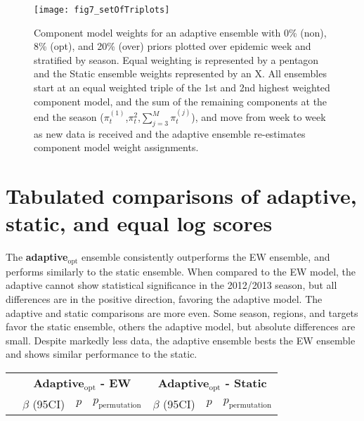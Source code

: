 \documentclass[sagev,times,Review,10pt]{sagej}
\def\adaptOpt{\textbf{adaptive$_{\text{opt}}$ }}
\begin{document}
\begin{appendix}
\graphicspath{{../../../_6_TLGs/_G/fig7_setOfTriPlots/}}
\begin{figure}[ht!]
    \centering
    \texttt{[image: fig7\_setOfTriplots]}
    \caption{Component model weights for an adaptive ensemble with 0\% (non), 8\% (opt), and 20\% (over) priors plotted over epidemic week and stratified by season.
    Equal weighting is represented by a pentagon and the Static ensemble weights represented by an X.
    All ensembles start at an equal weighted triple of the 1st and 2nd highest weighted component model, and the sum of the remaining components at the end the season ($\pi_{t}^{(1)}$,$\pi_{t}^{2}$,$\sum_{j=3}^{M}\pi_{t}^{(j)}$), and move from week to week as new data is received and the adaptive ensemble re-estimates component model weight assignments.
        \label{fig.bagOfDoritos}}
\end{figure}


\clearpage
\section{Tabulated comparisons of adaptive, static, and equal log scores}
\label{tbRegress}

The \adaptOpt ensemble consistently outperforms the EW ensemble, and performs similarly to the static ensemble.
When compared to the EW model, the adaptive cannot show statistical significance in the 2012/2013 season, but all differences are in the positive direction, favoring the adaptive model.
The adaptive and static comparisons are more even.
Some season, regions, and targets favor the static ensemble, others the adaptive model, but absolute differences are small.
Despite markedly less data, the adaptive ensemble bests the EW ensemble and shows similar performance to the static.

\begin{table}[ht!]
  \small
  \begin{tabular}{lcrrcrr}
    \hline
     & \multicolumn{3}{c}{\textbf{Adaptive$_{\text{opt}}$ - EW}} & \multicolumn{3}{c}{\textbf{Adaptive$_{\text{opt}}$ - Static}}\\
     & $\beta$ (95CI) & $p$ & $p_{\text{permutation}}$ & $\beta$ (95CI) & $p$ & $p_{\text{permutation}}$\\
     \hline
     

\end{tabular}
\end{table}
\end{appendix}
\end{document}
